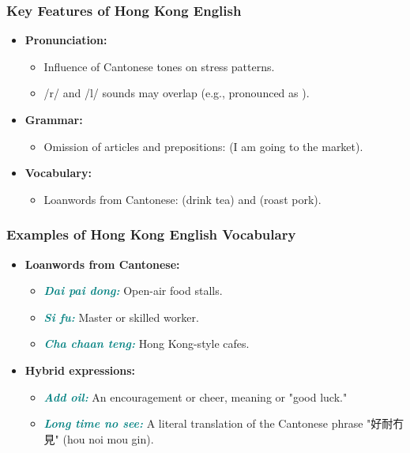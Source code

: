 \documentclass{beamer}
\renewcommand{\mtcitestyle}[1]{\textcolor{teal}{\textit{#1}}}
\newcommand{\lex}[1]{\textbf{\mtcitestyle{#1}}}
\begin{document}
\begin{frame}
\frametitle{Key Features of Hong Kong English}
\begin{itemize}
    \item \textbf{Pronunciation:}
    \begin{itemize}
        \item Influence of Cantonese tones on stress patterns.
        \item /r/ and /l/ sounds may overlap (e.g.,  pronounced as ).
    \end{itemize}
    \item \textbf{Grammar:}
    \begin{itemize}
        \item Omission of articles and prepositions:  (I am going to the market).
    \end{itemize}
    \item \textbf{Vocabulary:}
    \begin{itemize}
        \item Loanwords from Cantonese:  (drink tea) and  (roast pork).
    \end{itemize}
\end{itemize}
\end{frame}

\begin{frame}
\frametitle{Examples of Hong Kong English Vocabulary}
\begin{itemize}
    \item \textbf{Loanwords from Cantonese:}
    \begin{itemize}
        \item \lex{Dai pai dong:} Open-air food stalls.
        \item \lex{Si fu:} Master or skilled worker.
        \item \lex{Cha chaan teng:} Hong Kong-style cafes.
    \end{itemize}
    \item \textbf{Hybrid expressions:}
    \begin{itemize}
        \item \lex{Add oil:} An encouragement or cheer, meaning  or "good luck."
        \item \lex{Long time no see:} A literal translation of the Cantonese phrase "好耐冇見" (hou noi mou gin).
    \end{itemize}
\end{itemize}
\end{frame}
\end{document}
